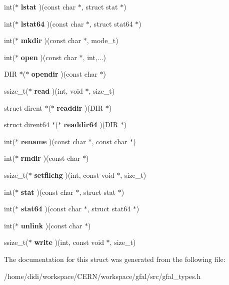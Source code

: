\begin{DoxyCompactItemize}
\item 
int($\ast$ {\bfseries lstat} )(const char $\ast$, struct stat $\ast$)\label{structproto__ops_ac0a25a0d6013554e77d12073d77be0e6}

\item 
int($\ast$ {\bfseries lstat64} )(const char $\ast$, struct stat64 $\ast$)\label{structproto__ops_ac1aea0acb196aef46a645cad7a152db2}

\item 
int($\ast$ {\bfseries mkdir} )(const char $\ast$, mode\_\-t)\label{structproto__ops_ad71f426f49c58e2b09fdbfe0e9d13aa9}

\item 
int($\ast$ {\bfseries open} )(const char $\ast$, int,...)\label{structproto__ops_a852c79a00037be5135a766f69cfbd933}

\item 
DIR $\ast$($\ast$ {\bfseries opendir} )(const char $\ast$)\label{structproto__ops_a458602e042cc80157288b247d22f4890}

\item 
ssize\_\-t($\ast$ {\bfseries read} )(int, void $\ast$, size\_\-t)\label{structproto__ops_a32bad14dfe74e231f12f1e70fb8cb62a}

\item 
struct dirent $\ast$($\ast$ {\bfseries readdir} )(DIR $\ast$)\label{structproto__ops_a8d632a633afaf127e2845defaef3e5ea}

\item 
struct dirent64 $\ast$($\ast$ {\bfseries readdir64} )(DIR $\ast$)\label{structproto__ops_a8d1c4d70eaa09012a4b5becdc993378c}

\item 
int($\ast$ {\bfseries rename} )(const char $\ast$, const char $\ast$)\label{structproto__ops_a546bf417f09d02e30f34745263944af9}

\item 
int($\ast$ {\bfseries rmdir} )(const char $\ast$)\label{structproto__ops_aa5f51bc56d7de9f2e2341650e46f2b3b}

\item 
ssize\_\-t($\ast$ {\bfseries setfilchg} )(int, const void $\ast$, size\_\-t)\label{structproto__ops_a4ed49ec0835b7cffa858fc5a43116e76}

\item 
int($\ast$ {\bfseries stat} )(const char $\ast$, struct stat $\ast$)\label{structproto__ops_a8bc73a59839ddeb06d6c4449cadbee9f}

\item 
int($\ast$ {\bfseries stat64} )(const char $\ast$, struct stat64 $\ast$)\label{structproto__ops_a369cbf47d0149739a4574d4bfe2d13ba}

\item 
int($\ast$ {\bfseries unlink} )(const char $\ast$)\label{structproto__ops_acaa5c130fb3ddb02522a7724d4b4a309}

\item 
ssize\_\-t($\ast$ {\bfseries write} )(int, const void $\ast$, size\_\-t)\label{structproto__ops_a2e436d3ab9be95949a2db5f5a3d3b80c}

\end{DoxyCompactItemize}


The documentation for this struct was generated from the following file:\begin{DoxyCompactItemize}
\item 
/home/didi/workspace/CERN/workspace/gfal/src/gfal\_\-types.h\end{DoxyCompactItemize}
